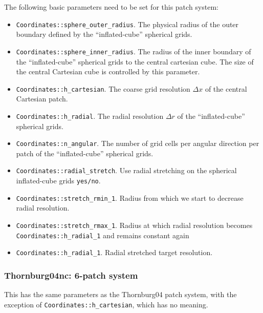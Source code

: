\documentclass{article}
\begin{document}
The following basic parameters need to be set for this patch system: 
 \begin{itemize}
 \item {\verb|Coordinates::sphere_outer_radius|}. The physical radius of the outer boundary defined by the ``inflated-cube'' spherical grids.
 \item {\verb|Coordinates::sphere_inner_radius|}. The radius of the inner boundary of the ``inflated-cube'' spherical grids to the central cartesian cube.
       The size of the central Cartesian cube is controlled by this parameter.
 \item {\verb|Coordinates::h_cartesian|}. The coarse grid resolution $\Delta x$ of the central Cartesian patch.
 \item {\verb|Coordinates::h_radial|}. The radial resolution $\Delta r$ of the ``inflated-cube'' spherical grids.
 \item {\verb|Coordinates::n_angular|}. The number of grid cells per angular direction per patch of the ``inflated-cube'' spherical grids.
 \item {\verb|Coordinates::radial_stretch|}. Use radial stretching on the spherical inflated-cube grids {\tt yes/no}.
 \item {\verb|Coordinates::stretch_rmin_1|}. Radius from which we start to decrease radial resolution.
 \item {\verb|Coordinates::stretch_rmax_1|}. Radius at which radial resolution becomes {\verb|Coordinates::h_radial_1|} and remains constant again
 \item {\verb|Coordinates::h_radial_1|}. Radial stretched target resolution.
\end{itemize}

\subsubsection{Thornburg04nc: 6-patch system}

This has the same parameters as the Thornburg04 patch system, with the
exception of {\verb|Coordinates::h_cartesian|}, which has no meaning.

\end{document}
